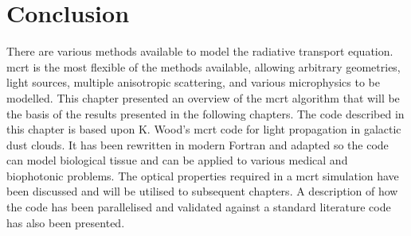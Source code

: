 \section{Conclusion}

There are various methods available to model the radiative transport equation.
\Gls*{mcrt} is the most flexible of the methods available, allowing arbitrary geometries, light sources, multiple anisotropic scattering, and various microphysics to be modelled.
This chapter presented an overview of the \gls*{mcrt} algorithm that will be the basis of the results presented in the following chapters.
The code described in this chapter is based upon K. Wood's \gls*{mcrt} code for light propagation in galactic dust clouds.
It has been rewritten in modern Fortran and adapted so the code can model biological tissue and can be applied to various medical and biophotonic problems.
The optical properties required in a \gls*{mcrt} simulation have been discussed and will be utilised to subsequent chapters.
A description of how the code has been parallelised and validated against a standard literature code has also been presented.
